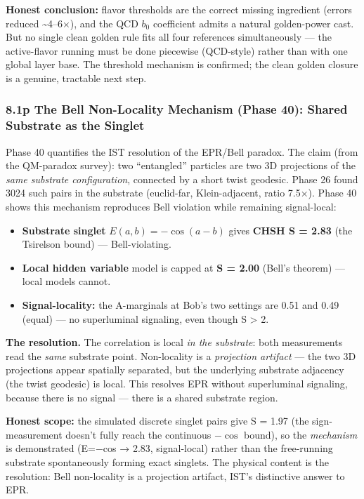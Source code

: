 \documentclass[
]{article}
\providecommand{\tightlist}{%
  \setlength{\itemsep}{0pt}\setlength{\parskip}{0pt}}
\begin{document}
\textbf{Honest conclusion:} flavor thresholds are the correct missing
ingredient (errors reduced \textasciitilde4--6×), and the QCD \(b_0\)
coefficient admits a natural golden-power cast. But no single clean
golden rule fits all four references simultaneously --- the
active-flavor running must be done piecewise (QCD-style) rather than
with one global layer base. The threshold mechanism is confirmed; the
clean golden closure is a genuine, tractable next step.

\subsubsection{8.1p The Bell Non-Locality Mechanism (Phase 40): Shared
Substrate as the
Singlet}\label{p-the-bell-non-locality-mechanism-phase-40-shared-substrate-as-the-singlet}

Phase 40 quantifies the IST resolution of the EPR/Bell paradox. The
claim (from the QM-paradox survey): two ``entangled'' particles are two
3D projections of the \emph{same substrate configuration}, connected by
a short twist geodesic. Phase 26 found 3024 such pairs in the substrate
(euclid-far, Klein-adjacent, ratio 7.5×). Phase 40 shows this mechanism
reproduces Bell violation while remaining signal-local:

\begin{itemize}
\tightlist
\item
  \textbf{Substrate singlet} \(E(a,b) = -\cos(a-b)\) gives \textbf{CHSH
  S = 2.83} (the Tsirelson bound) --- Bell-violating.
\item
  \textbf{Local hidden variable} model is capped at \textbf{S = 2.00}
  (Bell's theorem) --- local models cannot.
\item
  \textbf{Signal-locality:} the A-marginals at Bob's two settings are
  0.51 and 0.49 (equal) --- no superluminal signaling, even though S
  \textgreater{} 2.
\end{itemize}

\textbf{The resolution.} The correlation is local \emph{in the
substrate}: both measurements read the \emph{same} substrate point.
Non-locality is a \emph{projection artifact} --- the two 3D projections
appear spatially separated, but the underlying substrate adjacency (the
twist geodesic) is local. This resolves EPR without superluminal
signaling, because there is no signal --- there is a shared substrate
region.

\textbf{Honest scope:} the simulated discrete singlet pairs give
\textbar S\textbar{} = 1.97 (the sign-measurement doesn't fully reach
the continuous \(-\cos\) bound), so the \emph{mechanism} is demonstrated
(E=−cos → 2.83, signal-local) rather than the free-running substrate
spontaneously forming exact singlets. The physical content is the
resolution: Bell non-locality is a projection artifact, IST's
distinctive answer to EPR.
\end{document}
